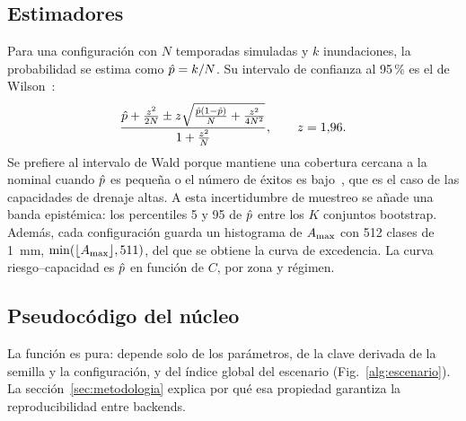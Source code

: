 \subsection{Estimadores}

Para una configuración con $N$ temporadas simuladas y $k$ inundaciones, la probabilidad se estima como $\hat{p} = k/N$. Su intervalo de confianza al 95\,\% es el de Wilson~\cite{wilson1927}:
\begin{equation}
\frac{\hat{p} + \frac{z^2}{2N} \pm z\sqrt{\frac{\hat{p}(1-\hat{p})}{N} + \frac{z^2}{4N^2}}}{1 + \frac{z^2}{N}}, \qquad z = 1{,}96.
\label{eq:wilson}
\end{equation}
Se prefiere al intervalo de Wald porque mantiene una cobertura cercana a la nominal cuando $\hat{p}$ es pequeña o el número de éxitos es bajo~\cite{agresti1998}, que es el caso de las capacidades de drenaje altas. A esta incertidumbre de muestreo se añade una banda epistémica: los percentiles 5 y 95 de $\hat{p}$ entre los $K$ conjuntos bootstrap. Además, cada configuración guarda un histograma de $A_{\max}$ con 512 clases de \qty{1}{\milli\metre}, $\min(\lfloor A_{\max}\rfloor, 511)$, del que se obtiene la curva de excedencia. La curva riesgo--capacidad es $\hat{p}$ en función de $C$, por zona y régimen.

\subsection{Pseudocódigo del núcleo}

La función  es pura: depende solo de los parámetros, de la clave derivada de la semilla y la configuración, y del índice global del escenario (Fig.~\ref{alg:escenario}). La sección~\ref{sec:metodologia} explica por qué esa propiedad garantiza la reproducibilidad entre backends.

